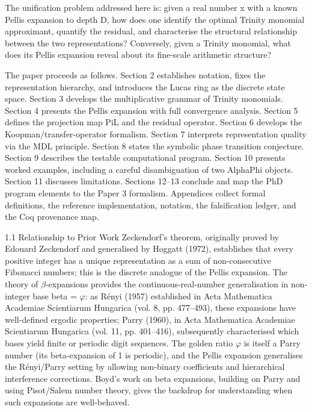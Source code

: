   The unification problem addressed here is: given a real number x with a known Pellis
  expansion to depth D, how does one identify the optimal Trinity monomial approximant,
  quantify the residual, and characterise the structural relationship between the two
  representations? Conversely, given a Trinity monomial, what does its Pellis expansion
  reveal about its fine-scale arithmetic structure?

  The paper proceeds as follows. Section 2 establishes notation, fixes the representation
  hierarchy, and introduces the Lucas ring as the discrete state space. Section 3 develops
  the multiplicative grammar of Trinity monomials. Section 4 presents the Pellis
  expansion with full convergence analysis. Section 5 defines the projection map PiL and
  the residual operator. Section 6 develops the Koopman/transfer-operator formalism.
  Section 7 interprets representation quality via the MDL principle. Section 8 states the
  symbolic phase transition conjecture. Section 9 describes the testable computational
  program. Section 10 presents worked examples, including a careful disambiguation of
  two AlphaPhi objects. Section 11 discusses limitations. Sections 12--13 conclude and
  map the PhD program elements to the Paper 3 formalism. Appendices collect formal
  definitions, the reference implementation, notation, the falsification ledger, and the Coq
  provenance map.

  1.1 Relationship to Prior Work
  Zeckendorf's theorem, originally proved by Edouard Zeckendorf and generalised by
  Hoggatt (1972), establishes that every positive integer has a unique representation as a
  sum of non-consecutive Fibonacci numbers; this is the discrete analogue of the Pellis
  expansion. The theory of $\beta$-expansions provides the continuous-real-number
  generalisation in non-integer base beta = $\varphi$: as Rényi (1957) established in Acta
  Mathematica Academiae Scientiarum Hungarica (vol. 8, pp. 477--493), these expansions
  have well-defined ergodic properties; Parry (1960), in Acta Mathematica Academiae
  Scientiarum Hungarica (vol. 11, pp. 401--416), subsequently characterised which bases
  yield finite or periodic digit sequences. The golden ratio $\varphi$ is itself a Parry number (its
  beta-expansion of 1 is periodic), and the Pellis expansion generalises the Rényi/Parry
  setting by allowing non-binary coefficients and hierarchical interference corrections.
  Boyd's work on beta expansions, building on Parry and using Pisot/Salem number
  theory, gives the backdrop for understanding when such expansions are well-behaved.

